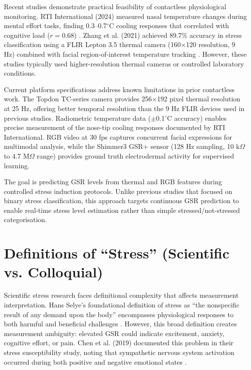 Recent studies demonstrate practical feasibility of contactless physiological monitoring. RTI International (2024) measured nasal temperature changes during mental effort tasks, finding 0.3--0.7$^\circ$C cooling responses that correlated with cognitive load ($r = 0.68$) \cite{ref6}. Zhang et al. (2021) achieved 89.7\% accuracy in stress classification using a FLIR Lepton 3.5 thermal camera (160$\times$120 resolution, 9 Hz) combined with facial region-of-interest temperature tracking \cite{ref5}. However, these studies typically used higher-resolution thermal cameras or controlled laboratory conditions.

Current platform specifications address known limitations in prior contactless work. The Topdon TC-series camera provides 256$\times$192 pixel thermal resolution at 25 Hz, offering better temporal resolution than the 9 Hz FLIR devices used in previous studies. Radiometric temperature data ($\pm$0.1$^\circ$C accuracy) enables precise measurement of the nose-tip cooling responses documented by RTI International. RGB video at 30 fps captures concurrent facial expressions for multimodal analysis, while the Shimmer3 GSR+ sensor (128 Hz sampling, 10 k$\Omega$ to 4.7 M$\Omega$ range) provides ground truth electrodermal activity for supervised learning.

The goal is predicting GSR levels from thermal and RGB features during controlled stress induction protocols. Unlike previous studies that focused on binary stress classification, this approach targets continuous GSR prediction to enable real-time stress level estimation rather than simple stressed/not-stressed categorisation.

\section{Definitions of ``Stress'' (Scientific vs. Colloquial)}
Scientific stress research faces definitional complexity that affects measurement interpretation. Hans Selye's foundational definition of stress as ``the nonspecific result of any demand upon the body'' encompasses physiological responses to both harmful and beneficial challenges \cite{ref11}. However, this broad definition creates measurement ambiguity: elevated GSR could indicate excitement, anxiety, cognitive effort, or pain. Chen et al. (2019) documented this problem in their stress susceptibility study, noting that sympathetic nervous system activation occurred during both positive and negative emotional states \cite{ref4}.

